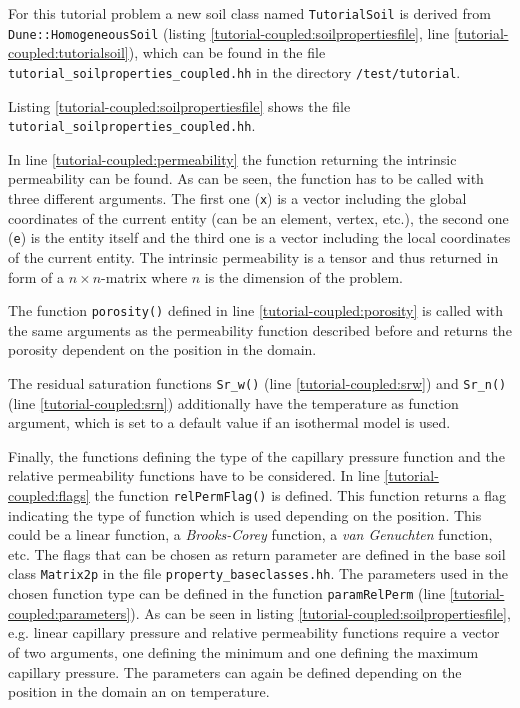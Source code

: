 For this tutorial problem a new soil class named \texttt{TutorialSoil} is derived from \texttt{Dune::HomogeneousSoil} (listing \ref{tutorial-coupled:soilpropertiesfile}, line \ref{tutorial-coupled:tutorialsoil}), which can be found in the file \texttt{tutorial\_soilproperties\_coupled.hh} in the directory \texttt{/test/tutorial}.

Listing \ref{tutorial-coupled:soilpropertiesfile} shows the file \texttt{tutorial\_soilproperties\_coupled.hh}.

\begin{lst}\label{tutorial-coupled:soilpropertiesfile} \mbox{}

\end{lst}

In line \ref{tutorial-coupled:permeability} the function returning the intrinsic permeability can be found. As can be seen, the function has to be called with three different arguments. The first one (\texttt{x}) is a vector including the global coordinates of the current entity (can be an element, vertex, etc.), the second one (\texttt{e}) is the entity itself and the third one is a vector including the local coordinates of the current entity. The intrinsic permeability is a tensor and thus returned in form of a $n \times n$-matrix where $n$ is the dimension of the problem.

The function \texttt{porosity()} defined in line \ref{tutorial-coupled:porosity} is called with the same arguments as the permeability function described before and returns the porosity dependent on the position in the domain.

The residual saturation functions \texttt{Sr\_w()} (line \ref{tutorial-coupled:srw}) and \texttt{Sr\_n()} (line \ref{tutorial-coupled:srn}) additionally have the temperature as function argument, which is set to a default value if an isothermal model is used.

Finally, the functions defining the type of the capillary pressure function and the relative permeability functions have to be considered. In line \ref{tutorial-coupled:flags} the function \texttt{relPermFlag()} is defined. This function returns a flag indicating the type of function which is used depending on the position. This could be a linear function, a \textit{Brooks-Corey} function, a \textit{van Genuchten} function, etc. The flags that can be chosen as return parameter are defined in the base soil class \texttt{Matrix2p} in the file \texttt{property\_baseclasses.hh}. The parameters used in the chosen function type can be defined in the function \texttt{paramRelPerm} (line \ref{tutorial-coupled:parameters}). As can be seen in listing \ref{tutorial-coupled:soilpropertiesfile}, e.g. linear capillary pressure and relative permeability functions require a vector of two arguments, one defining the minimum and one defining the maximum capillary pressure. The parameters can again be defined depending on the position in the domain an on temperature.

